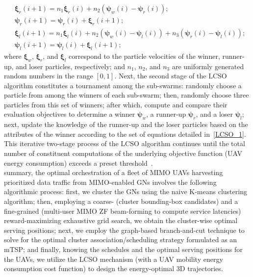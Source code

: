 \documentclass[10pt, twocolumn]{IEEEtran}
\begin{document}
\begin{align}\label{LCSO_1}
    &\boldsymbol{\xi}_{r}(i + 1) = n_{1}\boldsymbol{\xi}_{r}(i) + n_{2}\left(\boldsymbol{\psi}_{w}(i) - \boldsymbol{\psi}_{r}(i)\right);\nonumber\\
    &\boldsymbol{\psi}_{r}(i + 1) = \boldsymbol{\psi}_{r}(i) + \boldsymbol{\xi}_{r}(i + 1);\nonumber\\
    &\boldsymbol{\xi}_{l}(i{+}1){=}n_{1}\boldsymbol{\xi}_{l}(i){+}n_{2}\left(\boldsymbol{\psi}_{w}(i){-}\boldsymbol{\psi}_{l}(i)\right){+}n_{3}\left(\boldsymbol{\psi}_{r}(i){-}\boldsymbol{\psi}_{l}(i)\right);\nonumber\\
    &\boldsymbol{\psi}_{l}(i + 1) = \boldsymbol{\psi}_{l}(i) + \boldsymbol{\xi}_{l}(i + 1);
\end{align}
where $\boldsymbol{\xi}_{w}$, $\boldsymbol{\xi}_{r}$, and $\boldsymbol{\xi}_{l}$ correspond to the particle velocities of the winner, runner-up, and loser particles, respectively; and $n_{1}$, $n_{2}$, and $n_{3}$ are uniformly generated random numbers in the range $[0,1]$. Next, the second stage of the LCSO algorithm constitutes a tournament among the sub-swarms: randomly choose a particle from among the winners of each sub-swarm; then, randomly choose three particles from this set of winners; after which, compute and compare their evaluation objectives to determine a winner $\boldsymbol{\psi}_{w}$, a runner-up $\boldsymbol{\psi}_{r}$, and a loser $\boldsymbol{\psi}_{l}$; next, update the knowledge of the runner-up and the loser particles based on the attributes of the winner according to the set of equations detailed in~\eqref{LCSO_1}. This iterative two-stage process of the LCSO algorithm continues until the total number of constituent computations of the underlying objective function (UAV energy consumption) exceeds a preset threshold~\cite{LCSO}.\\
 summary, the optimal orchestration of a fleet of MIMO UAVs harvesting prioritized data traffic from MIMO-enabled GNs involves the following algorithmic process: first, we cluster the GNs using the naive K-means clustering algorithm; then, employing a coarse- (cluster bounding-box candidates) and a fine-grained (multi-user MIMO ZF beam-forming to compute service latencies) reward-maximizing exhaustive grid search, we obtain the cluster-wise optimal serving positions; next, we employ the graph-based branch-and-cut technique to solve for the optimal cluster association/scheduling strategy formulated as an mTSP; and finally, knowing the schedules and the optimal serving positions for the UAVs, we utilize the LCSO mechanism (with a UAV mobility energy consumption cost function) to design the energy-optimal $3$D trajectories.
\vspace{-6mm}
\end{document}
